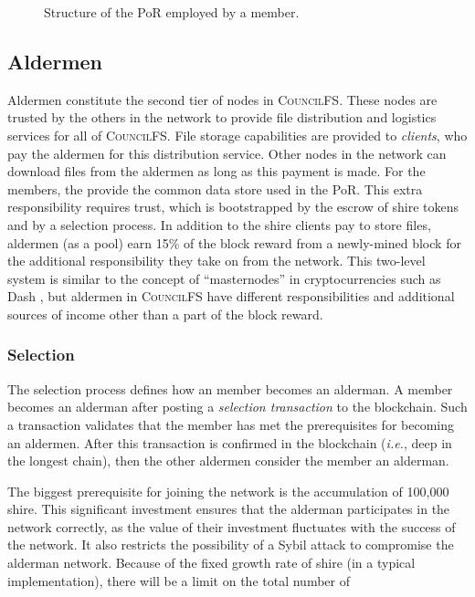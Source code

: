 \documentclass{article}
\begin{document}
\begin{figure}[t]
  \centering
  \fbox{\rule[-.5cm]{4cm}{4cm} \rule[-.5cm]{4cm}{0cm}}
  \caption{Structure of the PoR employed by a member.}
  \label{fig:por-member}
\end{figure}

\subsection{Aldermen}

Aldermen constitute the second tier of nodes in \textsc{CouncilFS}. These nodes
are trusted by the others in the network to provide file distribution and
logistics services for all of \textsc{CouncilFS}. File storage capabilities are
provided to \emph{clients}, who pay the aldermen for this distribution service.
Other nodes in the network can download files from the aldermen as long as this
payment is made. For the members, the provide the common data store used in the
PoR. This extra responsibility requires trust, which is bootstrapped by the
escrow of shire tokens and by a selection process. In addition to the shire
clients pay to store files, aldermen (as a pool) earn 15\% of the block reward
from a newly-mined block for the additional responsibility they take on from the
network. This two-level system is similar to the concept of ``masternodes'' in
cryptocurrencies such as Dash \cite{dash-coin}, but aldermen in
\textsc{CouncilFS} have different responsibilities and additional sources of
income other than a part of the block reward.

\subsubsection{Selection}

The selection process defines how an member becomes an alderman. A member
becomes an alderman after posting a \emph{selection transaction} to the
blockchain. Such a transaction validates that the member has met the
prerequisites for becoming an aldermen. After this transaction is confirmed in
the blockchain (\emph{i.e.}, deep in the longest chain), then the other aldermen
consider the member an alderman.

The biggest prerequisite for joining the network is the accumulation of 100,000
shire. This significant investment ensures that the alderman participates in the
network correctly, as the value of their investment fluctuates with the success
of the network. It also restricts the possibility of a Sybil attack to
compromise the alderman network. Because of the fixed growth rate of shire (in a
typical implementation), there will be a limit on the total number of
\end{document}
